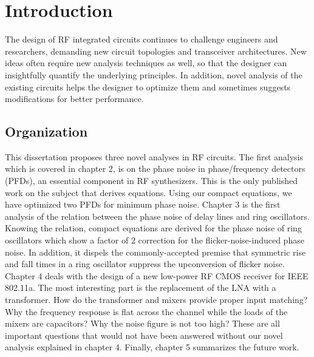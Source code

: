 \chapter{Introduction} 

The design of RF integrated circuits continues to challenge engineers and researchers, demanding new circuit topologies and transceiver architectures. New ideas often require new analysis techniques as well, so that the designer can insightfully quantify the underlying
principles. In addition, novel analysis of the existing circuits helps the designer to optimize them and sometimes suggests modifications for better performance.

\section{Organization} 

This dissertation proposes three novel analyses in RF circuits. The first analysis which is covered in chapter 2, is on the phase noise in phase/frequency detectors (PFDs), an essential component in RF synthesizers. This is the only published work on the subject that
derives equations. Using our compact equations, we have optimized two PFDs for minimum phase noise. Chapter 3 is the first analysis of the relation between the phase noise of delay lines and ring oscillators. Knowing the relation, compact equations are derived for the
phase noise of ring oscillators which show a factor of 2 correction for the flicker-noise-induced phase noise. In addition, it dispels the commonly-accepted premise that symmetric rise and fall times in a ring oscillator suppress the upconversion of flicker noise.
Chapter 4 deals with the design of a new low-power RF CMOS receiver for IEEE 802.11a. The most interesting part is the replacement of the LNA with a transformer. How do the transformer and mixers provide proper input matching? Why the frequency response is flat across
the channel while the loads of the mixers are capacitors? Why the noise figure is not too high? These are all important questions that would not have been answered without our novel analysis explained in chapter 4. Finally, chapter 5 summarizes the future work.
